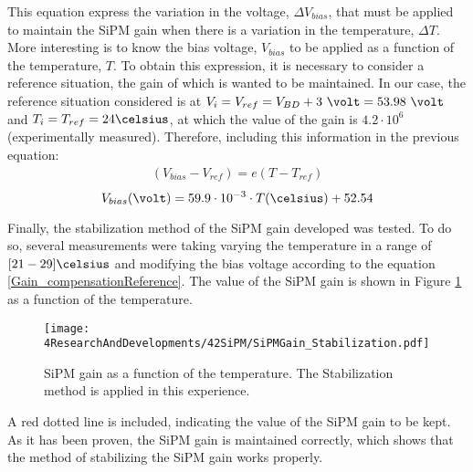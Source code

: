 This equation express the variation in the voltage, $\Delta V_{bias}$, that must be applied to maintain the SiPM gain when there is a variation in the temperature, $\Delta T$. More interesting is to know the bias voltage, $V_{bias}$ to be applied as a function of the temperature, $T$. To obtain this expression, it is necessary to consider a reference situation, the gain of which is wanted to be maintained. In our case, the reference situation considered is at $V_i=V_{ref}= V_{BD}+3~\volt = 53.98~\volt$ and $T_i=T_{ref}=24\celsius$, at which the value of the gain is $4.2 \cdot{} 10^{6}$ (experimentally measured). Therefore, including this information in the previous equation:
\begin{equation*}
\begin{split}
(V_{bias}-V_{ref} )= e \left( T -T_{ref} \right) 
\label{Gain_compensationEquation}
\end{split}
\end{equation*}
\begin{equation}
V_{bias}(\volt)= 59.9 \cdot{} 10^{-3} \cdot{} T(\celsius) + 52.54
\label{Gain_compensationReference}
\end{equation}  

Finally, the stabilization method of the SiPM gain developed was tested. To do so, several measurements were taking varying the temperature in a range of $[21-29]\celsius$ and modifying the bias voltage according to the equation \ref{Gain_compensationReference}. The value of the SiPM gain is shown in Figure \ref{fig:SiPMGainStabilization} as a function of the temperature.

\begin{figure}[hbtp]
\centering
\texttt{[image: 4ResearchAndDevelopments/42SiPM/SiPMGain\_Stabilization.pdf]}
\caption{SiPM gain as a function of the temperature. The Stabilization method is applied in this experience. \label{fig:SiPMGainStabilization}}
\end{figure}

A red dotted line is included, indicating the value of the SiPM gain to be kept. As it has been proven, the SiPM gain is maintained correctly, which shows that the method of stabilizing the SiPM gain works properly.